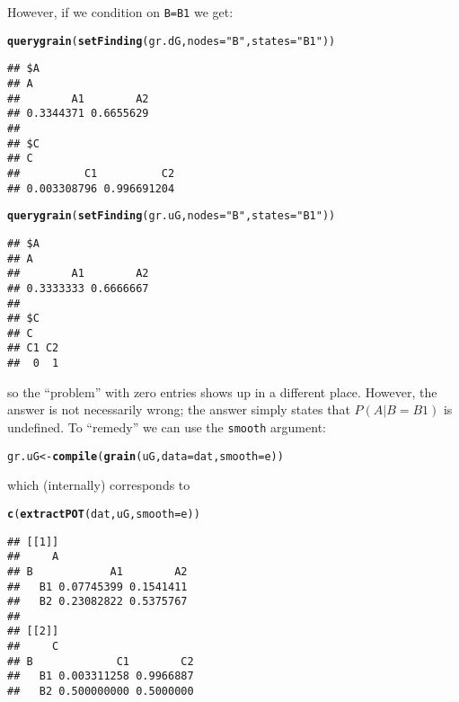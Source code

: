 \documentclass[10pt]{article}\usepackage[]{graphicx}\usepackage[]{color}
\makeatletter
\newcommand{\hlstr}[1]{\textcolor[rgb]{0.192,0.494,0.8}{#1}}%
\newcommand{\hlstd}[1]{\textcolor[rgb]{0.345,0.345,0.345}{#1}}%
\newcommand{\hlkwb}[1]{\textcolor[rgb]{0.69,0.353,0.396}{#1}}%
\newcommand{\hlkwc}[1]{\textcolor[rgb]{0.333,0.667,0.333}{#1}}%
\newcommand{\hlkwd}[1]{\textcolor[rgb]{0.737,0.353,0.396}{\textbf{#1}}}%
\newenvironment{kframe}{%
 \def\at@end@of@kframe{}%
 \ifinner\ifhmode%
  \def\at@end@of@kframe{\end{minipage}}%
  \begin{minipage}{\columnwidth}%
 \fi\fi%
 \def\FrameCommand##1{\hskip\@totalleftmargin \hskip-\fboxsep
 \colorbox{shadecolor}{##1}\hskip-\fboxsep
     \hskip-\linewidth \hskip-\@totalleftmargin \hskip\columnwidth}%
 \MakeFramed {\advance\hsize-\width
   \@totalleftmargin\z@ \linewidth\hsize
   \@setminipage}}%
 {\par\unskip\endMakeFramed%
 \at@end@of@kframe}
\newenvironment{knitrout}{}{} %
\def\code#1{{\texttt{#1}}}
\makeatother
\begin{document}
However, if we condition on \code{B=B1} we get:
\begin{knitrout}
\color{fgcolor}\begin{kframe}
\begin{alltt}
\hlkwd{querygrain}\hlstd{(}\hlkwd{setFinding}\hlstd{(gr.dG,} \hlkwc{nodes}\hlstd{=}\hlstr{"B"}\hlstd{,} \hlkwc{states}\hlstd{=}\hlstr{"B1"}\hlstd{))}
\end{alltt}
\begin{verbatim}
## $A
## A
##        A1        A2 
## 0.3344371 0.6655629 
## 
## $C
## C
##          C1          C2 
## 0.003308796 0.996691204
\end{verbatim}
\begin{alltt}
\hlkwd{querygrain}\hlstd{(}\hlkwd{setFinding}\hlstd{(gr.uG,} \hlkwc{nodes}\hlstd{=}\hlstr{"B"}\hlstd{,} \hlkwc{states}\hlstd{=}\hlstr{"B1"}\hlstd{))}
\end{alltt}
\begin{verbatim}
## $A
## A
##        A1        A2 
## 0.3333333 0.6666667 
## 
## $C
## C
## C1 C2 
##  0  1
\end{verbatim}
\end{kframe}
\end{knitrout}

so the ``problem'' with zero entries shows up in a different
place. However, the answer is not necessarily wrong; the answer simply
states that $P(A|B=B1)$ is undefined.
To ``remedy'' we can use the \code{smooth} argument:
\begin{knitrout}
\color{fgcolor}\begin{kframe}
\begin{alltt}
\hlstd{gr.uG} \hlkwb{<-} \hlkwd{compile}\hlstd{(}\hlkwd{grain}\hlstd{(uG,} \hlkwc{data}\hlstd{=dat,} \hlkwc{smooth}\hlstd{=e))}
\end{alltt}
\end{kframe}
\end{knitrout}
which (internally) corresponds to
\begin{knitrout}
\color{fgcolor}\begin{kframe}
\begin{alltt}
\hlkwd{c}\hlstd{(}\hlkwd{extractPOT}\hlstd{(dat, uG,} \hlkwc{smooth}\hlstd{=e))}
\end{alltt}
\begin{verbatim}
## [[1]]
##     A
## B            A1        A2
##   B1 0.07745399 0.1541411
##   B2 0.23082822 0.5375767
## 
## [[2]]
##     C
## B             C1        C2
##   B1 0.003311258 0.9966887
##   B2 0.500000000 0.5000000
\end{verbatim}
\end{kframe}
\end{knitrout}
\end{document}
